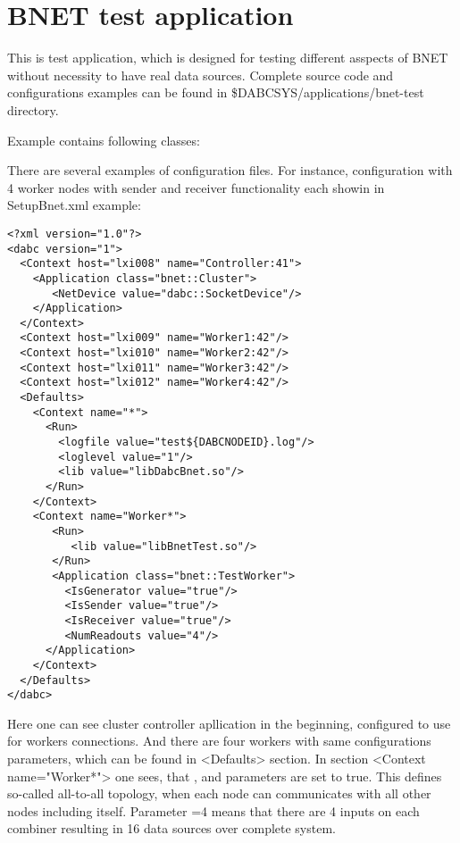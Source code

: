 \section{BNET test application}
\label{prog_exabnet_test}
This is test application, which is designed for testing different asspects of BNET
without necessity to have real data sources. Complete source code and configurations 
examples can be found in \$DABCSYS/applications/bnet-test directory.  

Example contains following classes:
\bbul
\item  {}
\item  {}
\item  {}
\item  {}
\item  {}
\item  {}
\ebul

There are several examples of configuration files. For instance,
configuration with 4 worker nodes with sender and receiver functionality each
showin in SetupBnet.xml example:

\begin{small}
\begin{verbatim}
<?xml version="1.0"?>
<dabc version="1">
  <Context host="lxi008" name="Controller:41">
    <Application class="bnet::Cluster">
       <NetDevice value="dabc::SocketDevice"/>
    </Application>
  </Context>
  <Context host="lxi009" name="Worker1:42"/>
  <Context host="lxi010" name="Worker2:42"/>
  <Context host="lxi011" name="Worker3:42"/>
  <Context host="lxi012" name="Worker4:42"/>
  <Defaults>
    <Context name="*">
      <Run>
        <logfile value="test${DABCNODEID}.log"/>
        <loglevel value="1"/>
        <lib value="libDabcBnet.so"/>
      </Run>
    </Context>
    <Context name="Worker*">
       <Run>
          <lib value="libBnetTest.so"/>
       </Run>
       <Application class="bnet::TestWorker">
         <IsGenerator value="true"/>
         <IsSender value="true"/>
         <IsReceiver value="true"/>
         <NumReadouts value="4"/>
      </Application>       
    </Context>
  </Defaults>
</dabc>
\end{verbatim}
\end{small}

Here one can see cluster controller apllication in the beginning, configured to
use  for workers connections. And there are four workers
with same configurations parameters, which can be found in <Defaults> section.
In section <Context name="Worker*"> one sees, 
that ,  and  parameters are set to true.
This defines so-called all-to-all topology, when each node can communicates with all other nodes including itself.   
Parameter =4 means that there are 4 inputs on each combiner resulting 
in 16 data sources over complete system.

